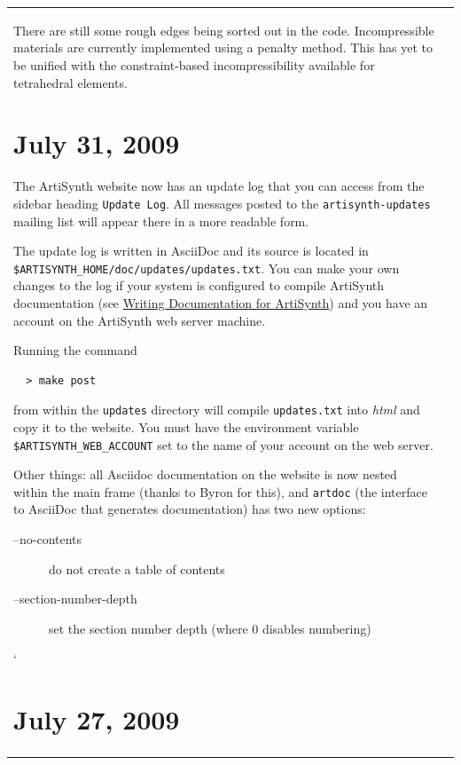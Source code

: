 \documentclass{article}
\begin{document}
\begin{tabular}{ll}
There are still some rough edges being sorted out in the code.
Incompressible materials are currently implemented using a penalty
method. This has yet to be unified with the constraint-based
incompressibility available for tetrahedral elements.

\section*{July 31, 2009}

The ArtiSynth website now has an update log that you can access from
the sidebar heading {\tt Update Log}. All messages posted to the
{\tt artisynth-updates} mailing list will appear there in a more readable
form.

The update log is written in AsciiDoc and its source is located in
{\tt \$ARTISYNTH\_HOME/doc/updates/updates.txt}. You can make your own
changes to the log if your system is configured to compile ArtiSynth
documentation (see
\href{http://www.magic.ubc.ca/artisynth/pmwiki.php?n=Documentation.Documentation}{%
Writing Documentation for ArtiSynth}) and you have an account on the ArtiSynth
web server machine.

Running the command

\begin{verbatim}
  > make post
\end{verbatim}

from within the {\tt updates} directory will compile {\tt updates.txt} into
{\it html} and copy it to the website. You must have the environment
variable {\tt \$ARTISYNTH\_WEB\_ACCOUNT} set to the name of your account on
the web server.

Other things: all Asciidoc documentation on the website is now nested
within the main frame (thanks to Byron for this), and {\tt artdoc} (the
interface to AsciiDoc that generates documentation) has two new
options:

\begin{description}

\item[--no-contents] \mbox{}

	do not create a table of contents

\item[--section-number-depth {\it depth}] \mbox{}

	set the section number depth (where 0 disables numbering)

\end{description}
`
\section*{July 27, 2009}


\end{tabular}
\end{document}
